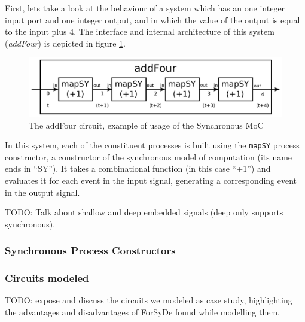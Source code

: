 \documentclass[a4paper]{article}
\begin{document}
                First, lets take a look at the behaviour of a system which has an one integer input
                port and one integer output, and in which the value of the output is equal to the
                input plus 4. The interface and internal architecture of this system
                (\emph{addFour}) is depicted in figure \ref{fig:forsyde-addFour}.
                \begin{figure}[h]
                    \begin{center}
                        \includegraphics[width=1.0\textwidth]{imgs/forsyde-addFour.pdf}
                    \end{center}
                    \caption{The addFour circuit, example of usage of the Synchronous MoC
                        \label{fig:forsyde-addFour}}
                \end{figure}

                In this system, each of the constituent processes is built using the \texttt{mapSY}
                process constructor, a constructor of the synchronous model of computation (its name
                ends in ``SY''). It takes a combinational function (in this case ``+1'') and
                evaluates it for each event in the input signal, generating a corresponding event in
                the output signal.

                TODO: Talk about shallow and deep embedded signals (deep only supports synchronous).

            \subsubsection{Synchronous Process Constructors}
            \label{subsubsec:forsyde-synchprocs}

            \subsubsection{Circuits modeled}
            \label{subsubsec:forsyde-circuits}
                TODO: expose and discuss the circuits we modeled as case study, highlighting the
                advantages and disadvantages of ForSyDe found while modelling them.
\end{document}
